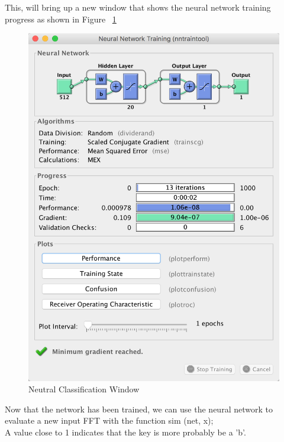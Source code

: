 \documentclass[12pt,a4paper]{article}
\begin{document}
This, will bring up a new window that shows the neural network training progress as shown in Figure ~\ref{fig:14} \\
\begin{figure}[h]
\begin{center}
        \includegraphics[scale=0.5]{fig14.png}
        \caption{Neutral Classification Window}
        \label{fig:14}
\end{center}
\end{figure} \par
\FloatBarrier

Now that the network has been trained, we can use the neural network to evaluate a new input FFT with the function sim (net, x);\\

A value close to 1 indicates that the key is more probably be a 'b'.\\
\end{document}
